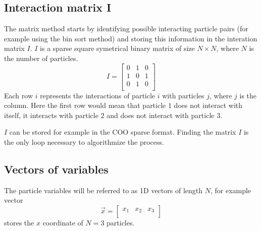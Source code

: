\documentclass{article}
\begin{document}
\subsection{Interaction matrix I}
The matrix method starts by identifying possible interacting particle pairs (for example using the bin sort method) and storing this information in the interation matrix $I$. $I$ is a sparse square symetrical binary matrix of size $N\times N$, where $N$ is the number of particles.
$$I = 
\begin{bmatrix}
0 & 1 & 0\\
1 & 0 & 1\\
0 & 1 & 0\\
\end{bmatrix}
$$
Each row $i$ represents the interactions of particle $i$ with particles $j$, where $j$ is the column. Here the first row would mean that particle $1$ does not interact with itself, it interacts with particle $2$ and does not interact with particle $3$. 

$I$ can be stored for example in the COO sparse format. Finding the matrix $I$ is the only loop necessary to algorithmize the process.
\subsection{Vectors of variables}
The particle variables will be referred to as 1D vectors of length $N$, for example vector
$$
\vec{x}=
\begin{bmatrix}
x_1 & x_2 & x_3\\
\end{bmatrix}
$$
stores the $x$ coordinate of $N=3$ particles.
\end{document}
